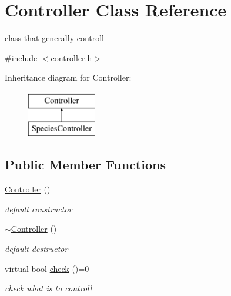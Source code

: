 \hypertarget{classController}{
\section{Controller Class Reference}
\label{classController}
}


class that generally controll  




{\ttfamily \#include $<$controller.h$>$}

Inheritance diagram for Controller:\begin{figure}[H]
\begin{center}
\leavevmode
\includegraphics[height=2.000000cm]{classController}
\end{center}
\end{figure}
\subsection*{Public Member Functions}
\begin{DoxyCompactItemize}
\item 
\hypertarget{classController_a29c0a59cb4df6cdde9ee13cd154a2535}{
\hyperlink{classController_a29c0a59cb4df6cdde9ee13cd154a2535}{Controller} ()}
\label{classController_a29c0a59cb4df6cdde9ee13cd154a2535}

\begin{DoxyCompactList}\small\item\em default constructor \end{DoxyCompactList}\item 
\hypertarget{classController_a582aba16637c5c7462e980446b370a22}{
\hyperlink{classController_a582aba16637c5c7462e980446b370a22}{$\sim$Controller} ()}
\label{classController_a582aba16637c5c7462e980446b370a22}

\begin{DoxyCompactList}\small\item\em default destructor \end{DoxyCompactList}\item 
virtual bool \hyperlink{classController_abcf0d0905edc35ee09dc761bd2878d6a}{check} ()=0
\begin{DoxyCompactList}\small\item\em check what is to controll \end{DoxyCompactList}\end{DoxyCompactItemize}


